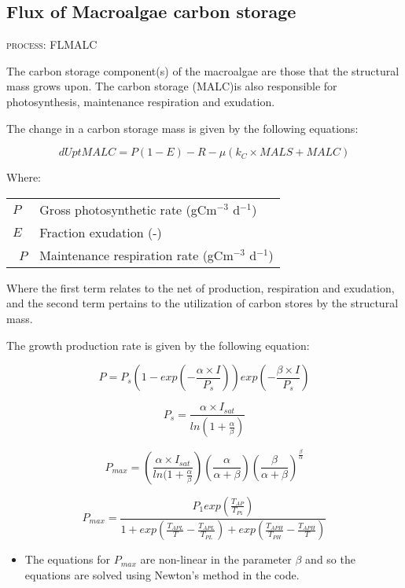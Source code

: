 \documentclass{deltares_manual}
\begin{document}
\subsection{Flux of Macroalgae carbon storage}
\begin{flushright}
\textsc{process: FLMALC}
\end{flushright}

The carbon storage component(s) of the macroalgae are those that the structural mass grows upon. The carbon storage (MALC)is also responsible for photosynthesis, maintenance respiration and exudation. 

The change in a carbon storage mass is given by the following equations:

\[dUptMALC = P(1-E)-R - \mu(k_C \times MALS + MALC)\]

Where:
\begin{tabular}{ll}
$P$ & Gross photosynthetic rate (gCm$^{-3}$ d$^{-1}$)\\
$E$ & Fraction exudation (-)\\\
$P$ & Maintenance respiration rate (gCm$^{-3}$ d$^{-1}$)\\
\end{tabular}

Where the first term relates to the net of production, respiration and exudation, and the second term pertains to the utilization of carbon stores by the structural mass.

The growth production rate is given by the following equation:

\[P = P_s(1-exp(-\frac{\alpha \times I}{P_s}))exp(-\frac{\beta \times I}{P_s})\]

\[P_s = \frac{\alpha \times I_{sat}}{ln(1+\frac{\alpha}{\beta})}\]

\[P_{max} = (\frac{\alpha \times I_{sat}}{ln(1+\frac{\alpha}{\beta}})(\frac{\alpha}{\alpha+\beta})(\frac{\beta}{\alpha+\beta})^{\frac{\beta}{\alpha}}\]

\[P_{max} = \frac{P_1exp(\frac{T_{AP}}{T_{P1}})}{1+exp(\frac{T_{APL}}{T} - \frac{T_{APL}}{T_{PL}})+exp(\frac{T_{APH}}{T_{PH}}-\frac{T_{APH}}{T})}\]

\begin{itemize}
\item The equations for $P_{max}$ are non-linear in the parameter $\beta$ and so the equations are solved using Newton's method in the code.
\end{itemize}
\end{document}

